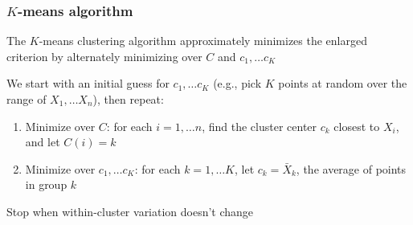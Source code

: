 \documentclass[mathserif]{beamer}
\def\blue{\color[rgb]{0,0,0.8}}
\begin{document}
\begin{frame}
\frametitle{$K$-means algorithm}
The {\blue $K$-means} clustering algorithm approximately 
minimizes the enlarged criterion 
by {\blue alternately minimizing} over $C$ and 
$c_1,\ldots c_K$

\bigskip
We start with an initial guess for $c_1,\ldots c_K$
(e.g., pick $K$ points at random over the range of
$X_1,\ldots X_n$), then repeat:
\begin{enumerate}
\item {\blue Minimize over $C$}: for each  
$i=1,\ldots n$, find the cluster center $c_k$ closest 
to $X_i$, and let $C(i)=k$
\item {\blue Minimize over $c_1,\ldots c_K$}: for each 
$k=1,\ldots K$, let $c_k = \bar{X}_k$,
the average of points in group $k$
\end{enumerate}
Stop when within-cluster variation doesn't change


\end{frame}
\end{document}
